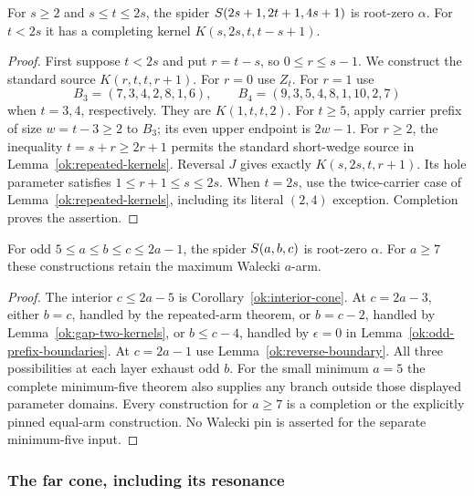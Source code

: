 \begin{lemma}\label{ok:reverse-boundary}
For $s\ge2$ and $s\le t\le2s$, the spider
$S\!\left(2s+1,2t+1,4s+1\right)$ is root-zero $\alpha$.
For $t<2s$ it has a completing kernel $K(s,2s,t,t-s+1)$.
\end{lemma}
\begin{proof}
First suppose $t<2s$ and put $r=t-s$, so $0\le r\le s-1$.
We construct the standard source $K(r,t,t,r+1)$.
For $r=0$ use $Z_t$. For $r=1$ use
\[
 B_3=(7,3,4,2,8,1,6),\qquad
 B_4=(9,3,5,4,8,1,10,2,7)
 \tag{B}\label{ok:B-small}
 \]
when $t=3,4$, respectively. They are $K(1,t,t,2)$.
For $t\ge5$, apply carrier prefix of size $w=t-3\ge2$ to
$B_3$; its even upper endpoint is $2w-1$.
For $r\ge2$, the inequality $t=s+r\ge2r+1$ permits the
standard short-wedge source in Lemma~\ref{ok:repeated-kernels}.
Reversal $J$ gives exactly $K(s,2s,t,r+1)$.
Its hole parameter satisfies $1\le r+1\le s\le2s$.
When $t=2s$, use the twice-carrier case of
Lemma~\ref{ok:repeated-kernels}, including its literal $(2,4)$
exception. Completion proves the assertion.
\end{proof}

\begin{proposition}\label{ok:central-cone}
For odd $5\le a\le b\le c\le2a-1$, the spider
$S\!\left(a,b,c\right)$ is root-zero $\alpha$.
For $a\ge7$ these constructions retain the maximum Walecki $a$-arm.
\end{proposition}
\begin{proof}
The interior $c\le2a-5$ is Corollary~\ref{ok:interior-cone}.
At $c=2a-3$, either $b=c$, handled by the repeated-arm theorem,
or $b=c-2$, handled by Lemma~\ref{ok:gap-two-kernels}, or
$b\le c-4$, handled by $\epsilon=0$ in
Lemma~\ref{ok:odd-prefix-boundaries}.
At $c=2a-1$ use Lemma~\ref{ok:reverse-boundary}.
All three possibilities at each layer exhaust odd $b$.
For the small minimum $a=5$ the complete minimum-five theorem also
supplies any branch outside those displayed parameter domains.
Every construction for $a\ge7$ is a completion or the explicitly
pinned equal-arm construction. No Walecki pin is asserted for the
separate minimum-five input.
\end{proof}

\subsubsection{The far cone, including its resonance}

